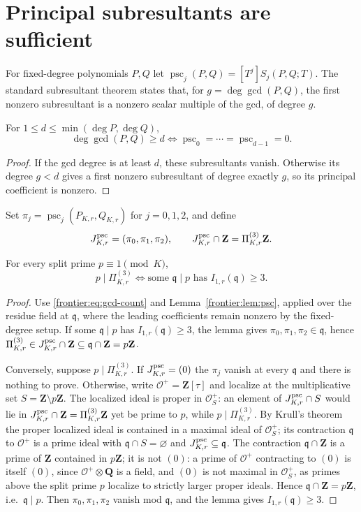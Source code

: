 \section{Principal subresultants are sufficient}
For fixed-degree polynomials $P,Q$ let
$\operatorname{psc}_j(P,Q)=[T^j]S_j(P,Q;T)$.
The standard subresultant theorem \cite{BT1971} states that, for
$g=\deg\gcd(P,Q)$, the first nonzero subresultant is a nonzero scalar
multiple of the gcd, of degree $g$.
\begin{lemma}\label{frontier:lem:psc}
For $1\le d\le\min(\deg P,\deg Q)$,
\[
\deg\gcd(P,Q)\ge d\iff
\operatorname{psc}_0=\cdots=\operatorname{psc}_{d-1}=0.
\]
\end{lemma}
\begin{proof}
If the gcd degree is at least $d$, these subresultants vanish. Otherwise its
degree $g<d$ gives a first nonzero subresultant of degree exactly $g$, so its
principal coefficient is nonzero.
\end{proof}
Set $\pi_j=\operatorname{psc}_j(P_{K,r},Q_{K,r})$ for $j=0,1,2$, and define
\[
J^{\rm psc}_{K,r}=(\pi_0,\pi_1,\pi_2),\qquad
J^{\rm psc}_{K,r}\cap\mathbf Z=\Pi_{K,r}^{(3)}\mathbf Z.
\]
\begin{theorem}\label{frontier:thm:psc-support}
For every split prime $p\equiv1\pmod K$,
\[
p\mid\Pi_{K,r}^{(3)}\iff
\text{some }\mathfrak q\mid p\text{ has }I_{1,r}(\mathfrak q)\ge3.
\]
\end{theorem}
\begin{proof}
Use \eqref{frontier:eq:gcd-count} and Lemma~\ref{frontier:lem:psc}, applied
over the residue field at $\mathfrak q$, where the leading coefficients remain
nonzero by the fixed-degree setup. If some $\mathfrak q\mid p$ has
$I_{1,r}(\mathfrak q)\ge3$, the lemma gives
$\pi_0,\pi_1,\pi_2\in\mathfrak q$, hence
$\Pi_{K,r}^{(3)}\in J^{\rm psc}_{K,r}\cap\mathbf Z\subseteq
\mathfrak q\cap\mathbf Z=p\mathbf Z$.

Conversely, suppose $p\mid\Pi_{K,r}^{(3)}$. If $J^{\rm psc}_{K,r}=(0)$ the
$\pi_j$ vanish at every $\mathfrak q$ and there is nothing to prove. Otherwise,
write $\mathcal O^+=\mathbf Z[\tau]$ and localize at the multiplicative set
$S=\mathbf Z\setminus p\mathbf Z$. The localized ideal is proper in
$\mathcal O^+_S$: an element of $J^{\rm psc}_{K,r}\cap S$ would lie in
$J^{\rm psc}_{K,r}\cap\mathbf Z=\Pi_{K,r}^{(3)}\mathbf Z$ yet be prime to $p$,
while $p\mid\Pi_{K,r}^{(3)}$. By Krull's theorem the proper localized ideal is
contained in a maximal ideal of $\mathcal O^+_S$; its contraction
$\mathfrak q$ to $\mathcal O^+$ is a prime ideal with
$\mathfrak q\cap S=\varnothing$ and $J^{\rm psc}_{K,r}\subseteq\mathfrak q$.
The contraction $\mathfrak q\cap\mathbf Z$ is a prime of $\mathbf Z$ contained
in $p\mathbf Z$; it is not $(0)$: a prime of $\mathcal O^+$ contracting to
$(0)$ is itself $(0)$, since $\mathcal O^+\otimes\mathbf Q$ is a field, and
$(0)$ is not maximal in $\mathcal O^+_S$, as primes above the split prime
$p$ localize to strictly larger proper ideals. Hence
$\mathfrak q\cap\mathbf Z=p\mathbf Z$, i.e.\ $\mathfrak q\mid p$. Then
$\pi_0,\pi_1,\pi_2$ vanish mod $\mathfrak q$, and the lemma gives
$I_{1,r}(\mathfrak q)\ge3$.
\end{proof}
